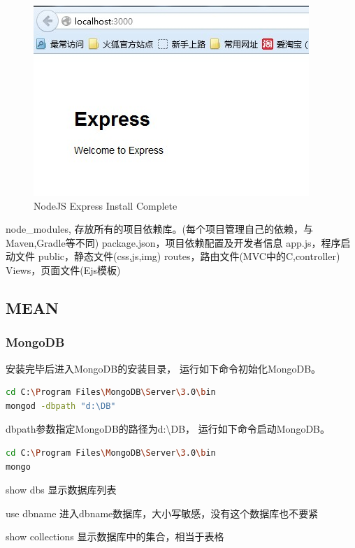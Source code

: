 \documentclass{book}
\begin{document}
\begin{figure}[htbp]
	\centering
	\includegraphics[scale=1]{StartPortSuccess.jpg}
	\caption{NodeJS Express Install Complete}
	\label{fig:StartPortSuccess}
\end{figure}


node\_modules, 存放所有的项目依赖库。(每个项目管理自己的依赖，与Maven,Gradle等不同)
package.json，项目依赖配置及开发者信息
app.js，程序启动文件
public，静态文件(css,js,img)
routes，路由文件(MVC中的C,controller)
Views，页面文件(Ejs模板)

\subsection{MEAN}

\subsubsection{MongoDB}

安装完毕后进入MongoDB的安装目录，
运行如下命令初始化MongoDB。

\begin{lstlisting}[language=Bash]
cd C:\Program Files\MongoDB\Server\3.0\bin
mongod -dbpath "d:\DB"
\end{lstlisting}

dbpath参数指定MongoDB的路径为d:\textbackslash DB，
运行如下命令启动MongoDB。

\begin{lstlisting}[language=Bash]
cd C:\Program Files\MongoDB\Server\3.0\bin
mongo
\end{lstlisting}


show dbs    显示数据库列表

use dbname    进入dbname数据库，大小写敏感，没有这个数据库也不要紧

show collections    显示数据库中的集合，相当于表格
\end{document}
